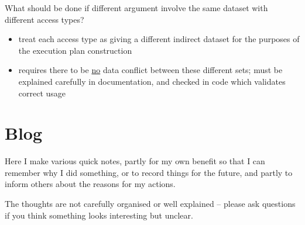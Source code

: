 \documentclass[12pt]{article}
\begin{document}
What should be done if different argument involve the same dataset 
with different access types?

\begin{itemize}
\item
treat each access type as giving a different indirect dataset 
for the purposes of the execution plan construction
\item
requires there to be \underline{no} data conflict between these
different sets; must be explained carefully in documentation,
and checked in code which validates correct usage
\end{itemize}


\newpage

\section{Blog}

Here I make various quick notes, partly for my own benefit so that I 
can remember why I did something, or to record things for the future, 
and partly to inform others about the reasons for my actions.

The thoughts are not carefully organised or well explained -- please 
ask questions if you think something looks interesting but unclear.
\end{document}
